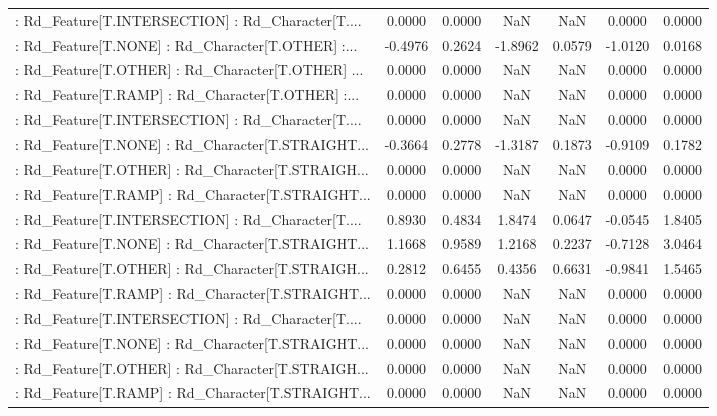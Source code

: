 \begin{longtable}{p{4cm}cccccc}
 : Rd\_Feature[T.INTERSECTION] : Rd\_Character[T.... &  0.0000 &    0.0000 &     NaN &          NaN &  0.0000 &  0.0000 \\
 : Rd\_Feature[T.NONE] : Rd\_Character[T.OTHER] :... & -0.4976 &    0.2624 & -1.8962 &       0.0579 & -1.0120 &  0.0168 \\
 : Rd\_Feature[T.OTHER] : Rd\_Character[T.OTHER] ... &  0.0000 &    0.0000 &     NaN &          NaN &  0.0000 &  0.0000 \\
 : Rd\_Feature[T.RAMP] : Rd\_Character[T.OTHER] :... &  0.0000 &    0.0000 &     NaN &          NaN &  0.0000 &  0.0000 \\
 : Rd\_Feature[T.INTERSECTION] : Rd\_Character[T.... &  0.0000 &    0.0000 &     NaN &          NaN &  0.0000 &  0.0000 \\
 : Rd\_Feature[T.NONE] : Rd\_Character[T.STRAIGHT... & -0.3664 &    0.2778 & -1.3187 &       0.1873 & -0.9109 &  0.1782 \\
 : Rd\_Feature[T.OTHER] : Rd\_Character[T.STRAIGH... &  0.0000 &    0.0000 &     NaN &          NaN &  0.0000 &  0.0000 \\
 : Rd\_Feature[T.RAMP] : Rd\_Character[T.STRAIGHT... &  0.0000 &    0.0000 &     NaN &          NaN &  0.0000 &  0.0000 \\
 : Rd\_Feature[T.INTERSECTION] : Rd\_Character[T.... &  0.8930 &    0.4834 &  1.8474 &       0.0647 & -0.0545 &  1.8405 \\
 : Rd\_Feature[T.NONE] : Rd\_Character[T.STRAIGHT... &  1.1668 &    0.9589 &  1.2168 &       0.2237 & -0.7128 &  3.0464 \\
 : Rd\_Feature[T.OTHER] : Rd\_Character[T.STRAIGH... &  0.2812 &    0.6455 &  0.4356 &       0.6631 & -0.9841 &  1.5465 \\
 : Rd\_Feature[T.RAMP] : Rd\_Character[T.STRAIGHT... &  0.0000 &    0.0000 &     NaN &          NaN &  0.0000 &  0.0000 \\
 : Rd\_Feature[T.INTERSECTION] : Rd\_Character[T.... &  0.0000 &    0.0000 &     NaN &          NaN &  0.0000 &  0.0000 \\
 : Rd\_Feature[T.NONE] : Rd\_Character[T.STRAIGHT... &  0.0000 &    0.0000 &     NaN &          NaN &  0.0000 &  0.0000 \\
 : Rd\_Feature[T.OTHER] : Rd\_Character[T.STRAIGH... &  0.0000 &    0.0000 &     NaN &          NaN &  0.0000 &  0.0000 \\
 : Rd\_Feature[T.RAMP] : Rd\_Character[T.STRAIGHT... &  0.0000 &    0.0000 &     NaN &          NaN &  0.0000 &  0.0000 \\

\end{longtable}
